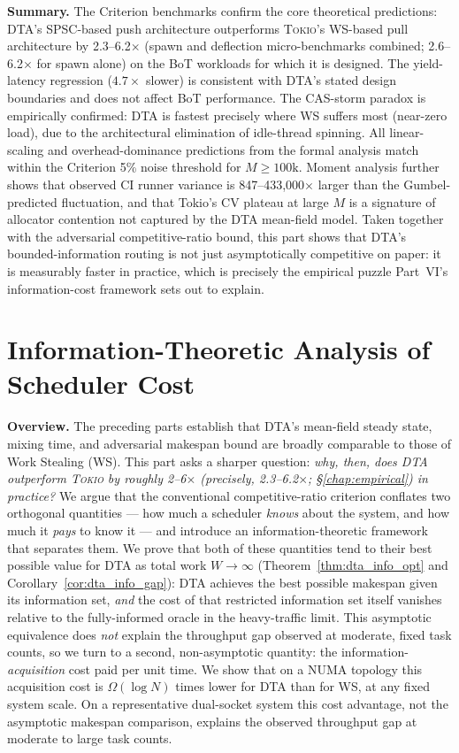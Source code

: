 \documentclass[11pt,a4paper]{article}
\newcommand{\partbreak}{\clearpage\phantomsection}
\newcommand{\dtact}{\textsc{DTA}}
\newcommand{\tokio}{\textsc{Tokio}}
\begin{document}
\bigskip
\noindent\textbf{Summary.}
The Criterion benchmarks confirm the core theoretical predictions:
DTA's SPSC-based push architecture outperforms \tokio{}'s
WS-based pull architecture by 2.3--6.2$\times$ (spawn and deflection
micro-benchmarks combined; 2.6--6.2$\times$ for spawn alone) on the BoT
workloads for which it is designed.
The yield-latency regression ($4.7\times$ slower) is consistent with
DTA's stated design boundaries and does not affect BoT performance.
The CAS-storm paradox is empirically confirmed: DTA is fastest precisely
where WS suffers most (near-zero load), due to the architectural elimination
of idle-thread spinning.
All linear-scaling and overhead-dominance predictions from the formal
analysis match within the Criterion 5\% noise threshold for $M \ge 100\mathrm{k}$.
Moment analysis further shows that observed CI runner variance is
847--433{,}000$\times$ larger than the Gumbel-predicted fluctuation,
and that Tokio's CV plateau at large $M$ is a signature of allocator
contention not captured by the DTA mean-field model. Taken together with
the adversarial competitive-ratio bound, this part shows that DTA's
bounded-information routing is not just asymptotically competitive on
paper: it is measurably faster in practice, which is precisely the
empirical puzzle Part~VI's information-cost framework sets out to
explain.

\partbreak
\part{Information-Theoretic Analysis of Scheduler Cost}

\bigskip
\noindent\textbf{Overview.}
The preceding parts establish that DTA's mean-field steady state, mixing
time, and adversarial makespan bound are broadly comparable to those of
Work Stealing (WS).  This part asks a sharper question: \emph{why, then,
does \dtact{} outperform \tokio{} by roughly 2--6$\times$
(precisely, 2.3--6.2$\times$; \S\ref{chap:empirical}) in practice?}
We argue that the conventional competitive-ratio criterion conflates two
orthogonal quantities --- how much a scheduler \emph{knows} about the
system, and how much it \emph{pays} to know it --- and introduce an
information-theoretic framework that separates them.  We prove that both
of these quantities tend to their best possible value for DTA as total
work $W \to \infty$ (Theorem~\ref{thm:dta_info_opt} and
Corollary~\ref{cor:dta_info_gap}): DTA achieves the best possible
makespan given its information set, \emph{and} the cost of that
restricted information set itself vanishes relative to the fully-informed
oracle in the heavy-traffic limit. This asymptotic equivalence does
\emph{not} explain the throughput gap observed at moderate, fixed task
counts, so we turn to a second, non-asymptotic quantity: the
information-\emph{acquisition} cost paid per unit time. We show that on a
NUMA topology this acquisition cost is $\Omega(\log N)$ times lower for
DTA than for WS, at any fixed system scale. On a representative
dual-socket system this cost advantage, not the asymptotic makespan
comparison, explains the observed throughput gap at moderate to large
task counts.
\end{document}
